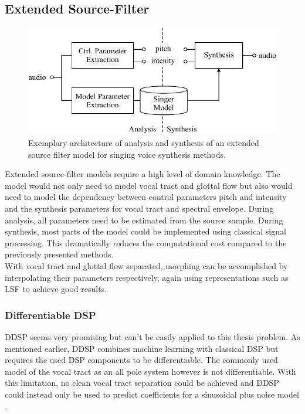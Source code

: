 \documentclass{article}
\begin{document}
\subsection*{Extended Source-Filter}
    
\begin{figure}[H]
    \centering
    \includegraphics{Graphics/009_method_extended_source_filter.pdf}
    \caption{Exemplary architecture of analysis and synthesis of an extended source filter model for singing voice synthesis methods. }
    \label{fig:method_esf}
\end{figure}

Extended source-filter models require a high level of domain knowledge. The model would not only need to model vocal tract and glottal flow but also would need to model the dependency between control parameters pitch and intensity and the synthesis parameters for vocal tract and spectral envelope. During analysis, all parameters need to be estimated from the source sample. During synthesis, most parts of the model could be implemented using classical signal processing. This dramatically reduces the computational cost compared to the previously presented methods.\\
With vocal tract and glottal flow separated, morphing can be accomplished by interpolating their parameters respectively, again using representations such as LSF to achieve good results.

\subsubsection*{Differentiable DSP}

DDSP \cite{engel_ddsp:_2020} seems very promising but can't be easily applied to this thesis problem. As mentioned earlier, DDSP combines machine learning with classical DSP but requires the used DSP components to be differentiable. The commonly used model of the vocal tract as an all pole system however is not differentiable. With this limitation, no clean vocal tract separation could be achieved and DDSP could instead only be used to predict coefficients for a sinusoidal plus noise model \cite{serra_musical_1997}.
\end{document}
